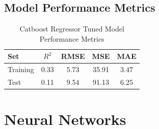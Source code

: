 \subsection*{Model Performance Metrics}
\begin{table}[H]
    \centering
    \caption{Catboost Regressor Tuned Model Performance Metrics}
    \label{tab:catboost_regressor_performance}
    \begin{tabular}{lcccc}
    \hline
    Set & $R^2$ & RMSE & MSE & MAE \\ 
    \hline
    Training & 0.33 & 5.73 & 35.91 & 3.47 \\
    Test & 0.11 & 9.54 & 91.13 & 6.25 \\
    \hline
    \end{tabular}
\end{table}

\section{Neural Networks}